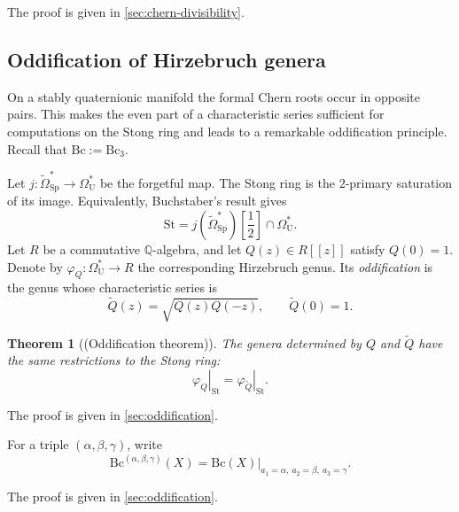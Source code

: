 \documentclass[14pt,dvipsnames]{extarticle}
\numberwithin{equation}{subsection}
\theoremstyle{plain}
\newtheorem{theorem}[theorem]{Theorem}
\newtheorem{corollary}[corollary]{Corollary}
\theoremstyle{definition}
\theoremstyle{definition}
\DeclareMathOperator{\Td}{Td}
\newcommand{\OmU}{\Omega_{\mathrm U}^{\ast}}
\newcommand{\OmSpfree}{\widetilde{\Omega}_{\mathrm{Sp}}}
\newcommand{\Bc}{\mathrm{Bc}}
\newcommand{\St}{\mathrm{St}}
\begin{document}
The proof is given in \cref{sec:chern-divisibility}.



\subsection{Oddification of Hirzebruch genera}

On a stably quaternionic manifold the formal Chern roots occur in opposite pairs. This
makes the even part of a characteristic series sufficient for computations on
the Stong ring and leads to a remarkable oddification principle. Recall that $\Bc := \Bc_3$.

Let $j\colon\OmSpfree^{\ast}\to\OmU$ be the forgetful map. The Stong ring is
the $2$-primary saturation of its image. Equivalently, Buchstaber's result
\cite[Theorem~4.1 and Lemma~6.6]{Buc78} gives
\[
 \St=j(\OmSpfree^{\ast})\!\left[\frac12\right]\cap\OmU.
\]
Let $R$ be a commutative $\mathbb Q$-algebra,
and let $Q(z)\in R[[z]]$ satisfy $Q(0)=1$. Denote by
$\varphi_Q\colon\OmU\to R$ the corresponding Hirzebruch genus. Its \emph{oddification} is the genus whose characteristic
series is
\begin{equation}\label{eq:oddification-Q}
 \widetilde Q(z)=\sqrt{Q(z)Q(-z)},
 \qquad \widetilde Q(0)=1.
\end{equation}

\begin{theorem}[(Oddification theorem)]
\label{thm:oddification-stong}
The genera determined by $Q$ and $\widetilde Q$ have the same restrictions to
the Stong ring:
\[
 \left.\varphi_Q\right|_{\St}
 =\left.\varphi_{\widetilde Q}\right|_{\St}.
\]
\end{theorem}

The proof is given in \cref{sec:oddification}.

For a triple $(\alpha,\beta,\gamma)$, write
\[
 \Bc^{(\alpha,\beta,\gamma)}(X)
 =\left.\Bc(X)\right|_{a_1=\alpha,\ a_2=\beta,\ a_3=\gamma}.
\]


The proof is given in \cref{sec:oddification}.
\end{document}
